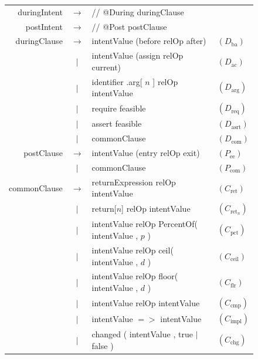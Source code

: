 \documentclass[pdflatex,sn-basic]{sn-jnl}%
\theoremstyle{thmstyleone}%
\theoremstyle{thmstyletwo}%
\theoremstyle{thmstylethree}%
\begin{document}
\begin{figure}[t]
\small
\begin{tabular}{@{}r@{\quad}c@{\quad}l@{\qquad}l@{}}
duringIntent & $\rightarrow$ & // @During duringClause & \\[2pt]
postIntent   & $\rightarrow$ & // @Post postClause & \\[6pt]

duringClause & $\rightarrow$ & intentValue (before relOp after)              & $(D_{\text{ba}})$ \\
             & $|$           & intentValue (assign relOp current)            & $(D_{\text{ac}})$ \\
             & $|$           & identifier .arg[ $n$ ] relOp intentValue     & $(D_{\text{arg}})$ \\
             & $|$           & require feasible                              & $(D_{\text{req}})$ \\
             & $|$           & assert feasible                               & $(D_{\text{asrt}})$ \\
             & $|$           & commonClause                                  & $(D_{\text{com}})$ \\[6pt]

postClause & $\rightarrow$ & intentValue (entry relOp exit)                   & $(P_{\text{ee}})$ \\
           & $|$           & commonClause                                     & $(P_{\text{com}})$ \\[6pt]

commonClause & $\rightarrow$ & returnExpression relOp intentValue             & $(C_{\text{ret}})$ \\
             & $|$           & return[$n$] relOp intentValue                  & $(C_{\text{ret}_n})$ \\
             & $|$           & intentValue relOp PercentOf( intentValue , $p$ )  & $(C_{\text{pct}})$ \\
             & $|$           & intentValue relOp ceil( intentValue , $d$ )    & $(C_{\text{ceil}})$ \\
             & $|$           & intentValue relOp floor( intentValue , $d$ )   & $(C_{\text{flr}})$ \\
             & $|$           & intentValue relOp intentValue                   & $(C_{\text{cmp}})$ \\
             & $|$           & intentValue ${=}{>}$ intentValue                & $(C_{\text{impl}})$ \\
             & $|$           & changed ( intentValue , true $|$ false )        & $(C_{\text{chg}})$ \\[6pt]


\end{tabular}
\end{figure}
\end{document}
